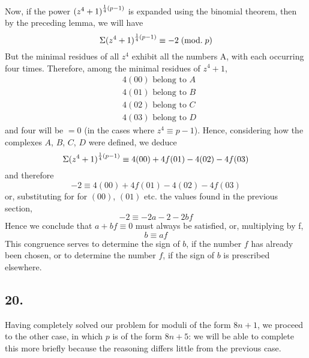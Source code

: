 \documentclass[twoside,12pt]{memoir}
\renewcommand{\pmod}[1]{\;(\textrm{mod.}\;#1)}
\let\oldfrac\frac
\def\frac#1#2{\mathchoice{\tfrac{#1}{#2}}{\oldfrac{#1}{#2}}{\genfrac{}{}{}{2}{#1}{#2\mathstrut}}{\genfrac{}{}{}{3}{#1}{#2\mathstrut}}}
\begin{document}
Now, if the power \((z^{4}+1)^{\frac{1}{4}(p-1)}\) is expanded using the binomial theorem, then by the preceding lemma, we will have
\[\Sigma(z^{4}+1)^{\frac{1}{4}(p-1)} \equiv-2\pmod{p}\]
But the minimal residues of all \(z^{4}\) exhibit all the numbers A, with each occurring four times. Therefore, among the minimal residues of \(z^{4}+1\),
\[\begin{aligned}
& 4(00) \text{ belong to } A \\
& 4(01) \text{ belong to } B \\
& 4(02) \text{ belong to } C \\
& 4(03) \text{ belong to } D
\end{aligned}\]
and four will be \(=0\) (in the cases where \(z^{4} \equiv p-1\)). Hence, considering how the complexes \(A\), \(B\), \(C\), \(D\) were defined, we deduce
\[\Sigma(z^{4}+1)^{\frac{1}{4}(p-1)} \equiv 4(00)+4 f(01)-4(02)-4 f(03)\]
and therefore
\[-2 \equiv 4(00)+4 f(01)-4(02)-4 f(03)\]
or, substituting for for \((00)\), \((01)\) etc{.} the values found in the previous section,
\[-2 \equiv-2 a-2-2 b f\]
Hence we conclude that \(a+b f \equiv 0 \) must always be satisfied, or, multiplying by f,
\[b \equiv a f\]
This congruence serves to determine the sign of \(b\), if the number \(f\) has already been chosen, or to determine the number \(f\), if the sign of \(b\) is prescribed elsewhere.

\subsection*{20.}

Having completely solved our problem for moduli of the form \(8n+1\), we proceed to the other case, in which \(p\) is of the form \(8n+5\): we will be able to complete this more briefly because the reasoning differs little from the previous case.
\end{document}
